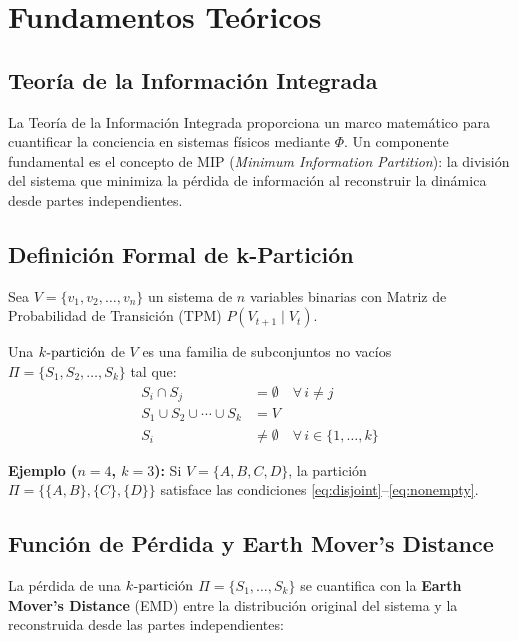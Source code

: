 \section{Fundamentos Teóricos}
\label{sec:fundamentos}

\subsection{Teoría de la Información Integrada}

La Teoría de la Información Integrada \cite{tononi2016} proporciona un marco matemático para cuantificar la conciencia en sistemas físicos mediante $\Phi$. Un componente fundamental es el concepto de MIP (\textit{Minimum Information Partition}): la división del sistema que minimiza la pérdida de información al reconstruir la dinámica desde partes independientes.

\subsection{Definición Formal de k-Partición}

Sea $V = \{v_1, v_2, \ldots, v_n\}$ un sistema de $n$ variables binarias con Matriz de Probabilidad de Transición (TPM) $P(V_{t+1} \mid V_t)$.

\begin{definition}[k-Partición]
Una \textbf{$\kpart$} de $V$ es una familia de subconjuntos no vacíos $\Pi = \{S_1, S_2, \ldots, S_k\}$ tal que:
\begin{align}
    S_i \cap S_j &= \emptyset \quad \forall\, i \neq j \label{eq:disjoint}\\
    S_1 \cup S_2 \cup \cdots \cup S_k &= V \label{eq:cover}\\
    S_i &\neq \emptyset \quad \forall\, i \in \{1,\ldots,k\} \label{eq:nonempty}
\end{align}
\end{definition}

\noindent\textbf{Ejemplo ($n=4$, $k=3$):} Si $V = \{A,B,C,D\}$, la partición $\Pi = \{\{A,B\},\{C\},\{D\}\}$ satisface las condiciones \eqref{eq:disjoint}--\eqref{eq:nonempty}.

\subsection{Función de Pérdida y Earth Mover's Distance}

La pérdida de una $\kpart$ $\Pi = \{S_1,\ldots,S_k\}$ se cuantifica con la \textbf{Earth Mover's Distance} (EMD) entre la distribución original del sistema y la reconstruida desde las partes independientes:


